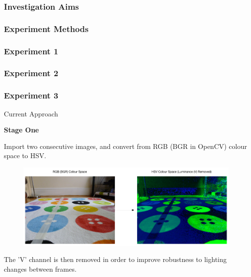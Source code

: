 \documentclass[10pt, compress]{beamer}
\begin{document}
\begin{frame}[fragile]
  \frametitle{Investigation Aims}

  
\end{frame}


\begin{frame}[fragile]
  \frametitle{Experiment Methods}
  
\end{frame}

\begin{frame}[fragile]
  \frametitle{Experiment 1}
  
\end{frame}

\begin{frame}[fragile]
  \frametitle{Experiment 2}
  
\end{frame}

\begin{frame}[fragile]
  \frametitle{Experiment 3}
  
\end{frame}

\begin{frame}{Current Approach}


\textbf{Stage One} \\ \vspace{0.2cm}

Import two consecutive images, and convert from RGB (BGR in OpenCV) colour space to HSV.

\begin{figure}[ht!]
\centering
\includegraphics[scale=0.26]{rgb2hsv.png}
  \end{figure}
  
The 'V' channel is then removed in order to improve robustness to lighting changes between frames. 
\end{frame}
\end{document}
